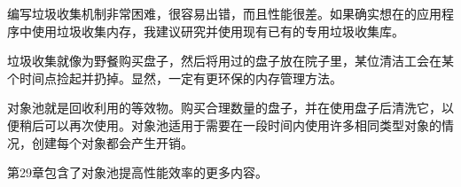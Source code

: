 编写垃圾收集机制非常困难，很容易出错，而且性能很差。如果确实想在的应用程序中使用垃圾收集内存，我建议研究并使用现有已有的专用垃圾收集库。


垃圾收集就像为野餐购买盘子，然后将用过的盘子放在院子里，某位清洁工会在某个时间点捡起并扔掉。显然，一定有更环保的内存管理方法。

对象池就是回收利用的等效物。购买合理数量的盘子，并在使用盘子后清洗它，以便稍后可以再次使用。对象池适用于需要在一段时间内使用许多相同类型对象的情况，创建每个对象都会产生开销。

第29章包含了对象池提高性能效率的更多内容。















